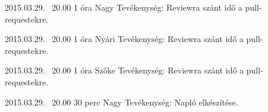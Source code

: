 \begin{naplo}
    \bejegyzes
    {2015.03.29. ~20.00}
    {1 óra}
    {Nagy} 
    {Tevékenység: Reviewra szánt idő a pull-requestekre.\newline } 

    \bejegyzes
    {2015.03.29. ~20.00}
    {1 óra}
    {Nyári} 
    {Tevékenység: Reviewra szánt idő a pull-requestekre.\newline } 

    \bejegyzes
    {2015.03.29. ~20.00}
    {1 óra}
    {Szőke} 
    {Tevékenység: Reviewra szánt idő a pull-requestekre.\newline } 
    
	\bejegyzes
	{2015.03.29. ~20.00}
	{30 perc}
	{Nagy} 
	{Tevékenység: Napló elkészítése.\newline } 
	
\end{naplo}



